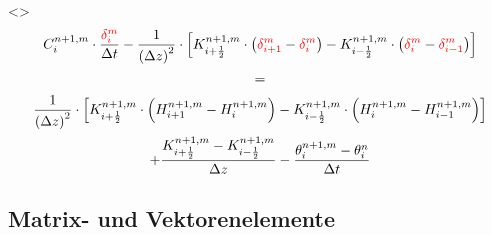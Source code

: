 \documentclass[xcolor=dvipsnames]{beamer}
\newcounter{fifthElement}
\begin{document}
\begin{frame}[t]
\only<\thefifthElement>{
    \begin{gather*}
      C_i^{n+1,m} \cdot \frac{\textcolor{red}{\delta_i^m}}{\Delta t} - \frac{1}{\left(\Delta z\right)^2} \cdot \left[K_{i+\frac{1}{2}}^{n+1,m} \cdot \left(\textcolor{red}{\delta_{i+1}^m} - \textcolor{red}{\delta_i^m}\right) - K_{i-\frac{1}{2}}^{n+1,m} \cdot \left(\textcolor{red}{\delta_i^m} - \textcolor{red}{\delta_{i-1}^m}\right)\right] \\[+0.5mm]
      = \\[+0.5mm]
      \frac{1}{\left(\Delta z\right)^2} \cdot \left[K_{i+\frac{1}{2}}^{n+1,m} \cdot \left(H_{i+1}^{n+1,m} - H_i^{n+1,m}\right) - K_{i-\frac{1}{2}}^{n+1,m} \cdot \left(H_{i}^{n+1,m} - H_{i-1}^{n+1,m}\right)\right] \\[+0.5mm]
      + \frac{K_{i+\frac{1}{2}}^{n+1,m} - K_{i-\frac{1}{2}}^{n+1,m}}{\Delta z} - \frac{\theta_i^{n+1,m}-\theta_i^{n}}{\Delta t}
    \end{gather*}}

\end{frame}

\subsection{Matrix- und Vektorenelemente}  
\end{document}
